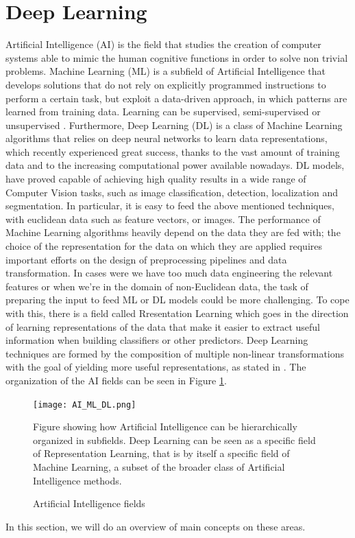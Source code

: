 \section{Deep Learning}\label{sec:deep_learning}
Artificial Intelligence (AI) is the field that studies the creation of computer systems able to mimic the human cognitive functions in order to solve non trivial problems.
Machine Learning (ML) is a subfield of Artificial Intelligence that develops solutions that do not rely on explicitly programmed instructions to perform a certain task, but exploit a data-driven approach, in which patterns are learned from training data.
Learning can be supervised, semi-supervised or unsupervised \cite{DBLP:journals/corr/Schmidhuber14}. 
Furthermore, Deep Learning (DL) is a class of Machine Learning algorithms that relies on deep neural networks to learn data representations, which recently experienced great success,   thanks to the vast amount of training data and to the increasing computational power available nowadays.
DL models, have proved capable of achieving  high quality results in a wide range of Computer Vision tasks, such as image classification, detection, localization and segmentation.
In particular, it is easy to feed the above mentioned techniques, with euclidean data such as feature vectors, or images. The performance of Machine Learning algorithms heavily depend on the data they are fed with; the choice of the representation for the data on which they are applied requires important efforts on the design of preprocessing pipelines and data transformation. In cases were we have too much data engineering the relevant features  or when we’re in the domain of non-Euclidean data, the task of preparing the input to feed ML or DL models could be more challenging. To cope with this, there is a field called Rresentation Learning which goes in the direction of learning representations of the data that make it easier to extract useful information when building classifiers or other predictors. 
Deep Learning techniques are formed by the composition of multiple non-linear transformations with the goal of yielding more useful representations, as stated in \cite{DBLP:journals/corr/Schmidhuber14}.
The organization of the AI fields can be seen in Figure \ref{fig:AI_ML_DL}.
\begin{figure} 
\centering
\texttt{[image: AI\_ML\_DL.png]}
\caption{Artificial Intelligence fields}
Figure showing how Artificial Intelligence can be hierarchically organized in subfields. Deep Learning can be seen as a specific field of Representation Learning, that is by itself a specific field of Machine Learning, a subset of the broader class of Artificial Intelligence methods.
\label{fig:AI_ML_DL}
\end{figure}
In this section, we will do an overview of main concepts on these areas.

